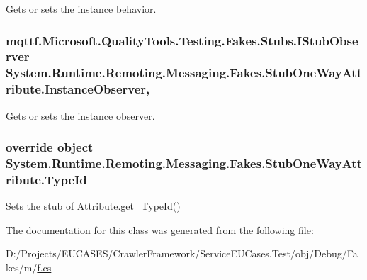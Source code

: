 Gets or sets the instance behavior.

\hypertarget{class_system_1_1_runtime_1_1_remoting_1_1_messaging_1_1_fakes_1_1_stub_one_way_attribute_a44fa722f8a2685b46c5d3f36063e8a6d}{
\subsubsection[{Instance\-Observer}]{\setlength{\rightskip}{0pt plus 5cm}mqttf.\-Microsoft.\-Quality\-Tools.\-Testing.\-Fakes.\-Stubs.\-I\-Stub\-Observer System.\-Runtime.\-Remoting.\-Messaging.\-Fakes.\-Stub\-One\-Way\-Attribute.\-Instance\-Observer\hspace{0.3cm}{\ttfamily [get]}, {\ttfamily [set]}}}\label{class_system_1_1_runtime_1_1_remoting_1_1_messaging_1_1_fakes_1_1_stub_one_way_attribute_a44fa722f8a2685b46c5d3f36063e8a6d}


Gets or sets the instance observer.

\hypertarget{class_system_1_1_runtime_1_1_remoting_1_1_messaging_1_1_fakes_1_1_stub_one_way_attribute_a26b2b4f85f7b74e543786799e00e81b8}{
\subsubsection[{Type\-Id}]{\setlength{\rightskip}{0pt plus 5cm}override object System.\-Runtime.\-Remoting.\-Messaging.\-Fakes.\-Stub\-One\-Way\-Attribute.\-Type\-Id\hspace{0.3cm}{\ttfamily [get]}}}\label{class_system_1_1_runtime_1_1_remoting_1_1_messaging_1_1_fakes_1_1_stub_one_way_attribute_a26b2b4f85f7b74e543786799e00e81b8}


Sets the stub of Attribute.\-get\-\_\-\-Type\-Id()



The documentation for this class was generated from the following file\-:\begin{DoxyCompactItemize}
\item 
D\-:/\-Projects/\-E\-U\-C\-A\-S\-E\-S/\-Crawler\-Framework/\-Service\-E\-U\-Cases.\-Test/obj/\-Debug/\-Fakes/m/\hyperlink{m_2f_8cs}{f.\-cs}\end{DoxyCompactItemize}
